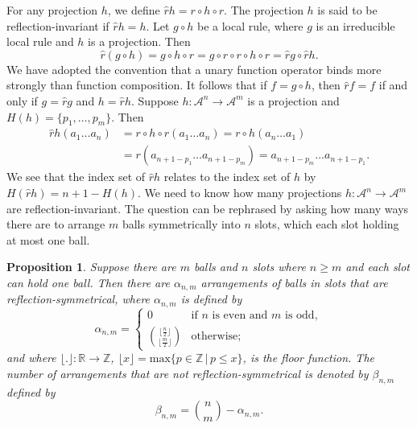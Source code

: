 \documentclass[a4paper]{article}
\newtheorem{prop}{Proposition}
\begin{document}
For any projection $h$, we define $\hat{r} h = r \circ h \circ r$.
The projection $h$ is said to be reflection-invariant if $\hat{r}h = h$.
Let $g \circ h$ be a local rule,  where $g$ is an irreducible local rule and $h$ is a projection.
Then
\[
\hat{r}(g \circ h)  = g \circ h \circ  r  = g \circ r \circ r \circ h \circ r =
\hat{r}g \circ \hat{r}h.
\]
We have adopted the convention that a unary function operator binds more strongly than function composition.
It follows that if $f = g \circ h$, then $\hat{r} f = f$ if and only if $g = \hat{r}g$ and $h = \hat{r}h$.
Suppose $h: \mathcal{A}^n \to \mathcal{A}^m$ is a projection and $H(h) = \{p_1, \ldots, p_m\}$.
Then
\begin{align*}
\hat{r}h(a_1\ldots a_n) & = r \circ h \circ r(a_1\ldots a_n) =
r \circ h(a_n \ldots a_1) \\
& = r(a_{n+1-{p_1}} \ldots a_{n+1-{p_m}})
= a_{n+1-{p_m}} \ldots a_{n+1-p_1}.
\end{align*}
We see that the index set of $\hat{r}h$ relates to the index set of $h$ by
$H(\hat{r}h) = n + 1 - H(h)$.
We need to know how many projections $h: \mathcal{A}^n \to \mathcal{A}^m$ are reflection-invariant.
The question can be rephrased by asking how many ways there are to arrange $m$ balls symmetrically into
$n$ slots, which each slot holding at most one ball.
\begin{prop}
\label{prop:inv-h}
Suppose there are $m$ balls and $n$ slots where $n \ge m$ and each slot can hold one ball.
Then there are $\alpha_{n,m}$ arrangements of balls in slots that are reflection-symmetrical,
where $\alpha_{n,m}$ is defined by
\[
\alpha_{n,m} = \left\{
\begin{array}{ll}
0 & \mbox{if $n$ is even and $m$ is odd}, \\
\binom{\lfloor \frac{n}{2} \rfloor }{\lfloor \frac{m}{2} \rfloor } & \mbox{otherwise;}
\end{array}
\right.
\]
and where $\lfloor.\rfloor : \mathbb{R} \to \mathbb{Z}$,
$\lfloor x \rfloor = \mathrm{max}\{ p \in \mathbb{Z} \, | \, p \le x\}$, is the floor function.
The number of arrangements that are not reflection-symmetrical is denoted by $\beta_{n,m}$ defined by
\[
\beta_{n,m} = \binom{n}{m} - \alpha_{n,m}.
\]
\end{prop}
\end{document}

